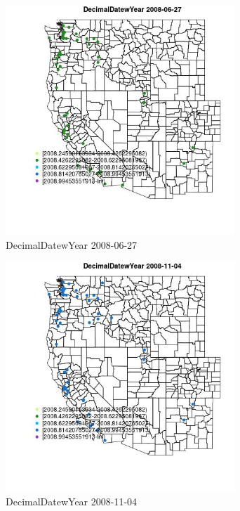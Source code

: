 \begin{figure} 
\centering  
\includegraphics[width=0.77\textwidth]{Code_Outputs/Report_ML_input_PM25_Step4_part_e_de_duplicated_aves_MapObsDecimalDatewYear2008-06-27.jpg} 
\caption{\label{fig:Report_ML_input_PM25_Step4_part_e_de_duplicated_avesMapObsDecimalDatewYear2008-06-27}DecimalDatewYear 2008-06-27} 
\end{figure} 
 

\begin{figure} 
\centering  
\includegraphics[width=0.77\textwidth]{Code_Outputs/Report_ML_input_PM25_Step4_part_e_de_duplicated_aves_MapObsDecimalDatewYear2008-11-04.jpg} 
\caption{\label{fig:Report_ML_input_PM25_Step4_part_e_de_duplicated_avesMapObsDecimalDatewYear2008-11-04}DecimalDatewYear 2008-11-04} 
\end{figure} 
 

